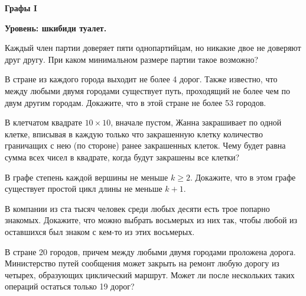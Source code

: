 \centerline{\bf \Huge Графы I}
\centerline{\bf \Huge Уровень: шкибиди туалет.}

Каждый член партии доверяет пяти однопартийцам, но никакие двое не доверяют друг другу. При каком минимальном размере партии такое возможно?

В стране из каждого города выходит не более 4   дорог. Также известно, что между любыми двумя городами существует путь, проходящий не более чем по двум другим городам. Докажите, что в этой стране не более 53   городов.

В клетчатом квадрате $10 \times 10$, вначале пустом, Жанна закрашивает по одной клетке, вписывая в каждую только что закрашенную клетку количество граничащих с нею (по стороне) ранее закрашенных клеток. Чему будет равна сумма всех чисел в квадрате, когда будут закрашены все клетки?

В графе степень каждой вершины не меньше $k \geqslant 2$. Докажите, что в этом графе существует простой цикл длины не меньше $k+1$.

В компании из ста тысяч человек среди любых десяти есть трое попарно знакомых. Докажите, что можно выбрать восьмерых из них так, чтобы любой из оставшихся был знаком с кем-то из этих восьмерых.

В стране 20 городов, причем между любыми двумя городами проложена дорога. Министерство путей сообщения может закрыть на ремонт любую дорогу из четырех, образующих циклический маршрут. Может ли после нескольких таких операций остаться только 19 дорог?